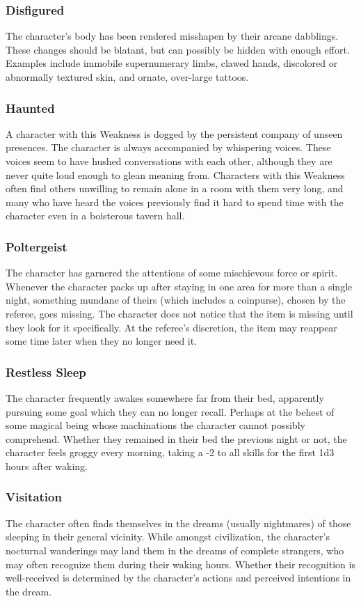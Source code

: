 \documentclass[oneside]{book}
\begin{document}
\begin{multicols}{2}
\subsubsection{Disfigured}
The character's body has been rendered misshapen by their arcane dabblings. These changes should be blatant, but can possibly be hidden with enough effort. Examples include immobile supernumerary limbs, clawed hands, discolored or abnormally textured skin, and ornate, over-large tattoos. 

\subsubsection{Haunted}
A character with this Weakness is dogged by the persistent company of unseen presences. The character is always accompanied by whispering voices. These voices seem to have hushed conversations with each other, although they are never quite loud enough to glean meaning from. Characters with this Weakness often find others unwilling to remain alone in a room with them very long, and many who have heard the voices previously find it hard to spend time with the character even in a boisterous tavern hall.  

\subsubsection{Poltergeist}
The character has garnered the attentions of some mischievous force or spirit. Whenever the character packs up after staying in one area for more than a single night, something mundane of theirs (which includes a coinpurse), chosen by the referee, goes missing. The character does not notice that the item is missing until they look for it specifically. At the referee's discretion, the item may reappear some time later when they no longer need it. 

\subsubsection{Restless Sleep}
The character frequently awakes somewhere far from their bed, apparently pursuing some goal which they can no longer recall. Perhaps at the behest of some magical being whose machinations the character cannot possibly comprehend. Whether they remained in their bed the previous night or not, the character feels groggy every morning, taking a -2 to all skills for the first 1d3 hours after waking.  

\subsubsection{Visitation}
The character often finds themselves in the dreams (usually nightmares) of those sleeping in their general vicinity. While amongst civilization, the character's nocturnal wanderings may land them in the dreams of complete strangers, who may often recognize them during their waking hours. Whether their recognition is well-received is determined by the character's actions and perceived intentions in the dream.  
\end{multicols}
\end{document}
